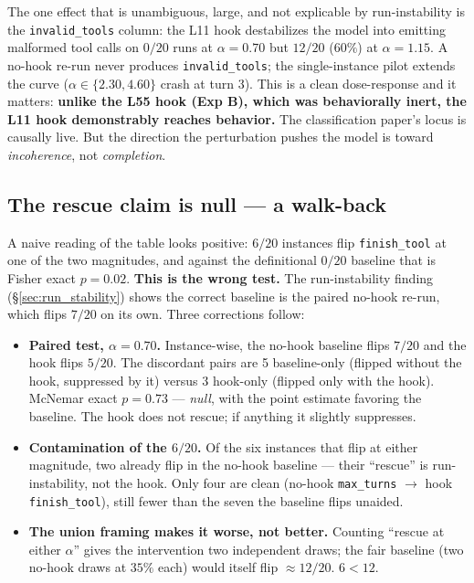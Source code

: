 \documentclass[11pt]{article}
\begin{document}
The one effect that is unambiguous, large, and not explicable by run-instability is the \texttt{invalid\_tools} column: the L11 hook destabilizes the model into emitting malformed tool calls on $0/20$ runs at $\alpha=0.70$ but $12/20$ ($60\%$) at $\alpha=1.15$. A no-hook re-run never produces \texttt{invalid\_tools}; the single-instance pilot extends the curve ($\alpha \in \{2.30, 4.60\}$ crash at turn 3). This is a clean dose-response and it matters: \textbf{unlike the L55 hook (Exp B), which was behaviorally inert, the L11 hook demonstrably reaches behavior.} The classification paper's locus is causally live. But the direction the perturbation pushes the model is toward \emph{incoherence}, not \emph{completion}.

\subsection{The rescue claim is null --- a walk-back}

A naive reading of the table looks positive: $6/20$ instances flip \texttt{finish\_tool} at one of the two magnitudes, and against the definitional $0/20$ baseline that is Fisher exact $p=0.02$. \textbf{This is the wrong test.} The run-instability finding (\S\ref{sec:run_stability}) shows the correct baseline is the paired no-hook re-run, which flips $7/20$ on its own. Three corrections follow:

\begin{itemize}
\item \textbf{Paired test, $\alpha=0.70$.} Instance-wise, the no-hook baseline flips $7/20$ and the hook flips $5/20$. The discordant pairs are 5 baseline-only (flipped without the hook, suppressed by it) versus 3 hook-only (flipped only with the hook). McNemar exact $p=0.73$ --- \emph{null}, with the point estimate favoring the baseline. The hook does not rescue; if anything it slightly suppresses.
\item \textbf{Contamination of the $6/20$.} Of the six instances that flip at either magnitude, two already flip in the no-hook baseline --- their ``rescue'' is run-instability, not the hook. Only four are clean (no-hook \texttt{max\_turns} $\to$ hook \texttt{finish\_tool}), still fewer than the seven the baseline flips unaided.
\item \textbf{The union framing makes it worse, not better.} Counting ``rescue at either $\alpha$'' gives the intervention two independent draws; the fair baseline (two no-hook draws at $35\%$ each) would itself flip $\approx 12/20$. $6 < 12$.
\end{itemize}
\end{document}
